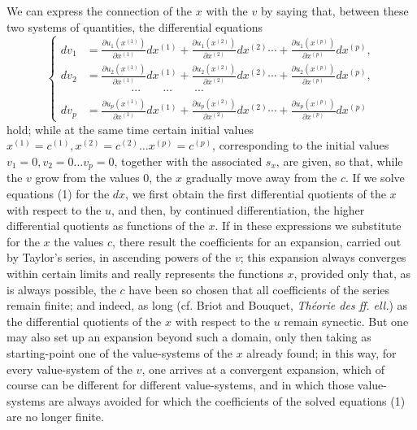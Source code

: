\documentclass[10pt]{article}
\begin{document}
We can express the connection of the \(x\) with the \(v\) by saying that, between these two systems of quantities, the differential equations
\[
\tag{1}\left\{\begin{aligned}
dv_1&=\frac{\partial u_1(x^{(1)})}{\partial x^{(1)}}dx^{(1)}+\frac{\partial u_1(x^{(2)})}{\partial x^{(2)}}dx^{(2)}\cdots+\frac{\partial u_1(x^{(p)})}{\partial x^{(p)}}dx^{(p)},\\
dv_2&=\frac{\partial u_2(x^{(1)})}{\partial x^{(1)}}dx^{(1)}+\frac{\partial u_2(x^{(2)})}{\partial x^{(2)}}dx^{(2)}\cdots+\frac{\partial u_2(x^{(p)})}{\partial x^{(p)}}dx^{(p)},\\[-0.35em]
&\hspace{4em}\cdots\qquad\cdots\qquad\cdots\\[-0.35em]
dv_p&=\frac{\partial u_p(x^{(1)})}{\partial x^{(1)}}dx^{(1)}+\frac{\partial u_p(x^{(2)})}{\partial x^{(2)}}dx^{(2)}\cdots+\frac{\partial u_p(x^{(p)})}{\partial x^{(p)}}dx^{(p)}
\end{aligned}\right.
\]
hold; while at the same time certain initial values \(x^{(1)}=c^{(1)},x^{(2)}=c^{(2)}\ldots x^{(p)}=c^{(p)}\), corresponding to the initial values \(v_1=0,v_2=0\ldots v_p=0\), together with the associated \(s_x\), are given, so that, while the \(v\) grow from the values 0, the \(x\) gradually move away from the \(c\). If we solve equations (1) for the \(dx\), we first obtain the first differential quotients of the \(x\) with respect to the \(u\), and then, by continued differentiation, the higher differential quotients as functions of the \(x\). If in these expressions we substitute for the \(x\) the values \(c\), there result the coefficients for an expansion, carried out by Taylor's series, in ascending powers of the \(v\); this expansion always converges within certain limits and really represents the functions \(x\), provided only that, as is always possible, the \(c\) have been so chosen that all coefficients of the series remain finite; and indeed, as long (cf. Briot and Bouquet, \emph{Théorie des ff. ell.}) as the differential quotients of the \(x\) with respect to the \(u\) remain synectic. But one may also set up an expansion beyond such a domain, only then taking as starting-point one of the value-systems of the \(x\) already found; in this way, for every value-system of the \(v\), one arrives at a convergent expansion, which of course can be different for different value-systems, and in which those value-systems are always avoided for which the coefficients of the solved equations (1) are no longer finite.
\end{document}
